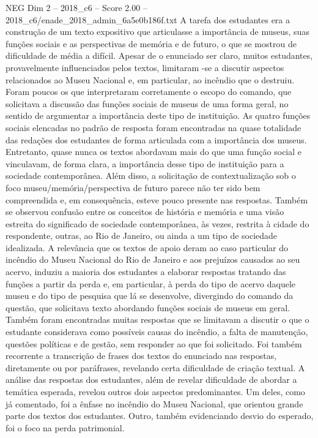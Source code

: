 \begin{textsample}{NEG Dim 2 – 2018\_c6 – Score 2.00 – 2018\_c6/enade\_2018\_admin\_6a5e0b186f.txt}
A tarefa dos estudantes era a construção de um texto expositivo que articulasse a importância de museus, suas funções sociais e as perspectivas de memória e de futuro, o que se mostrou de dificuldade de média a difícil.
Apesar de o enunciado ser claro, muitos estudantes, provavelmente influenciados pelos textos, limitaram -se a discutir aspectos relacionados ao Museu Nacional e, em particular, ao incêndio que o destruiu.
Foram poucos os que interpretaram corretamente o escopo do comando, que solicitava a discussão das funções sociais de museus de uma forma geral, no sentido de argumentar a importância deste tipo de instituição.
As quatro funções sociais elencadas no padrão de resposta foram encontradas na quase totalidade das redações dos estudantes de forma articulada com a importância dos museus.
Entretanto, quase nunca os textos abordavam mais do que uma função social e vinculavam, de forma clara, a importância desse tipo de instituição para a sociedade contemporânea.
Além disso, a solicitação de contextualização sob o foco museu/memória/perspectiva de futuro parece não ter sido bem compreendida e, em consequência, esteve pouco presente nas respostas.
Também se observou confusão entre os conceitos de história e memória e uma visão estreita do significado de sociedade contemporânea, às vezes, restrita à cidade do respondente, outras, ao Rio de Janeiro, ou ainda a um tipo de sociedade idealizada.
A relevância que os textos de apoio deram ao caso particular do incêndio do Museu Nacional do Rio de Janeiro e aos prejuízos causados ao seu acervo, induziu a maioria dos estudantes a elaborar respostas tratando das funções a partir da perda e, em particular, à perda do tipo de acervo daquele museu e do tipo de pesquisa que lá se desenvolve, divergindo do comando da questão, que solicitava texto abordando funções sociais de museus em geral.
Também foram encontradas muitas respostas que se limitavam a discutir o que o estudante considerava como possíveis causas do incêndio, a falta de manutenção, questões políticas e de gestão, sem responder ao que foi solicitado.
Foi também recorrente a transcrição de frases dos textos do enunciado nas respostas, diretamente ou por paráfrases, revelando certa dificuldade de criação textual.
A análise das respostas dos estudantes, além de revelar dificuldade de abordar a temática esperada, revelou outros dois aspectos predominantes.
Um deles, como já comentado, foi a ênfase no incêndio do Museu Nacional, que orientou grande parte dos textos dos estudantes.
Outro, também evidenciando desvio do esperado, foi o foco na perda patrimonial.

\end{textsample}
